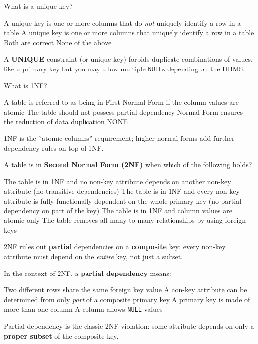 \question[4]
What is a unique key?
\begin{choices}
  \choice A unique key is one or more columns that do \emph{not} uniquely identify a row in a table
  \CorrectChoice A unique key is one or more columns that uniquely identify a row in a table
  \choice Both are correct
  \choice None of the above
\end{choices}
\begin{solution}
  A \textbf{UNIQUE} constraint (or unique key) forbids duplicate combinations of values, like a primary key but you may allow multiple \texttt{NULL}s depending on the DBMS.
\end{solution}

\question[4]
What is 1NF?
\begin{choices}
  \CorrectChoice A table is referred to as being in First Normal Form if the column values are atomic
  \choice The table should not possess partial dependency
  \choice Normal Form ensures the reduction of data duplication
  \choice NONE
\end{choices}
\begin{solution}
  1NF is the ``atomic columns'' requirement; higher normal forms add further dependency rules on top of 1NF.
\end{solution}

\question[4]
A table is in \textbf{Second Normal Form (2NF)} when which of the following holds?
\begin{choices}
  \choice The table is in 1NF and no non-key attribute depends on another non-key attribute (no transitive dependencies)
  \CorrectChoice The table is in 1NF and every non-key attribute is fully functionally dependent on the whole primary key (no partial dependency on part of the key)
  \choice The table is in 1NF and column values are atomic only
  \choice The table removes all many-to-many relationships by using foreign keys
\end{choices}
\begin{solution}
  2NF rules out \textbf{partial} dependencies on a \textbf{composite} key: every non-key attribute must depend on the \emph{entire} key, not just a subset.
\end{solution}

\question[4]
In the context of 2NF, a \textbf{partial dependency} means:
\begin{choices}
  \choice Two different rows share the same foreign key value
  \CorrectChoice A non-key attribute can be determined from only \emph{part} of a composite primary key
  \choice A primary key is made of more than one column
  \choice A column allows \texttt{NULL} values
\end{choices}
\begin{solution}
  Partial dependency is the classic 2NF violation: some attribute depends on only a \textbf{proper subset} of the composite key.
\end{solution}

